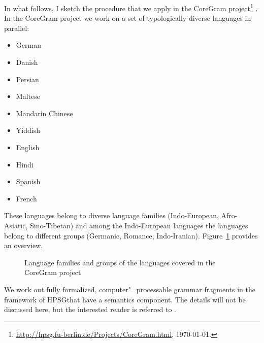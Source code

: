 In what follows, I sketch the procedure that we apply in the CoreGram project\footnote{
\url{http://hpsg.fu-berlin.de/Projects/CoreGram.html}, \today.
} \citep{MuellerCoreGramBrief,MuellerCoreGram}. In the CoreGram project we work on a set of
typologically diverse languages in parallel:
\begin{itemize}
\item German  \citep{MuellerLehrbuch1,MuellerPredication,MuellerCopula,MOe2011a,MOe2013a,MuellerArten,MuellerGS}
\item Danish  \citep{Oersnes2009a,MuellerPredication,MuellerCopula,MOe2011a,MOe2013a,MOe2013b,MOeDanish}
\item Persian \citep*{MuellerPersian,MG2010a}
\item Maltese \citep{MuellerMalteseSketch}
\item Mandarin Chinese \citep{Lipenkova2009a,ML2009a,ML2013a,MLChinese}
\item Yiddish \citep{MOe2011a}
\item English \citep{MuellerPredication,MuellerCopula,MOe2013a}
\item Hindi
\item Spanish \citep{Machicao-y-Priemer2015a}
\item French
\end{itemize}
\noindent
These languages belong to diverse language families 
(Indo-European, %
 Afro-Asiatic,  %
 Sino-Tibetan) %
and among the Indo-European languages the languages belong to different groups (Germanic, Romance,
Indo-Iranian). Figure~\ref{fig-lang-fams} provides an overview.
\begin{figure}[htb]
\caption{Language families and groups of the languages covered in the CoreGram project}\label{fig-lang-fams}
\end{figure}%
We work out fully formalized, computer"=processable grammar fragments in the framework of
HPSG\indexhpsg that have a semantics component. The details will not be discussed here, but the
interested reader is referred to . 

